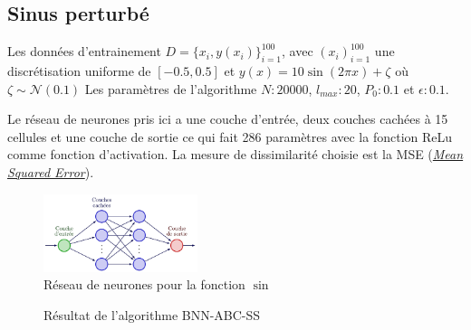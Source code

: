 \documentclass[french,12pt]{article}
\begin{document}
\subsection{Sinus perturbé}


Les données d'entrainement $D = \{x_i , y(x_i)\}_{i = 1}^{100}$, avec $(x_i)_{i = 1}^{100}$
une discrétisation uniforme de $[-0.5, 0.5]$ et $y(x) = 10 \sin(2 \pi x) + \zeta$ où $\zeta \sim \mathcal{N}(0.1)$
Les paramètres de l'algorithme $N : 20000$, $l_{max} : 20$, $P_0 : 0.1$ et $\epsilon : 0.1$.

Le réseau de neurones pris ici a une couche d'entrée, deux couches cachées à 15 cellules et une couche de sortie ce qui
fait 286 paramètres avec la fonction ReLu comme fonction d'activation. La mesure de dissimilarité
choisie est la MSE (\href{https://en.wikipedia.org/wiki/Mean_squared_error}{\textit{Mean Squared Error}}).


\begin{figure}[H]
    \centering
    \includegraphics[width = 0.4\textwidth]{FNN/Images/fnnSin/fnnSin_page-0001.jpg}
    \caption[short]{Réseau de neurones pour la fonction $\sin$}
\end{figure}

\begin{figure}[H]
    \centering
    \caption[short]{Résultat de l'algorithme BNN-ABC-SS}
\end{figure}
\end{document}
